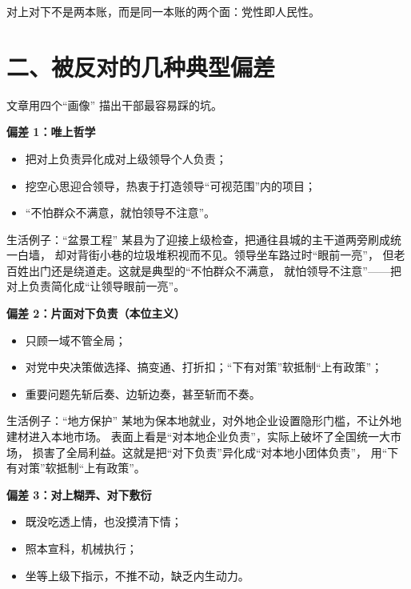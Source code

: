 \documentclass[11pt,a4paper]{ctexart}
\begin{document}
\begin{keypointblock}
对上对下不是两本账，而是同一本账的两个面：党性即人民性。
\end{keypointblock}

\section{二、被反对的几种典型偏差}

文章用四个``画像'' 描出干部最容易踩的坑。

\begin{caseblock}{}
\textbf{偏差 1：唯上哲学}
\begin{itemize}
  \item 把对上负责异化成对上级领导个人负责；
  \item 挖空心思迎合领导，热衷于打造领导``可视范围''内的项目；
  \item ``不怕群众不满意，就怕领导不注意''。
\end{itemize}
\end{caseblock}

\begin{exampleblock}{生活例子：``盆景工程''}
某县为了迎接上级检查，把通往县城的主干道两旁刷成统一白墙，
却对背街小巷的垃圾堆积视而不见。领导坐车路过时``眼前一亮''，
但老百姓出门还是绕道走。这就是典型的``不怕群众不满意，
就怕领导不注意''——把对上负责简化成``让领导眼前一亮''。
\end{exampleblock}

\begin{caseblock}{}
\textbf{偏差 2：片面对下负责（本位主义）}
\begin{itemize}
  \item 只顾一域不管全局；
  \item 对党中央决策做选择、搞变通、打折扣；``下有对策''软抵制``上有政策''；
  \item 重要问题先斩后奏、边斩边奏，甚至斩而不奏。
\end{itemize}
\end{caseblock}

\begin{exampleblock}{生活例子：``地方保护''}
某地为保本地就业，对外地企业设置隐形门槛，不让外地建材进入本地市场。
表面上看是``对本地企业负责''，实际上破坏了全国统一大市场，
损害了全局利益。这就是把``对下负责''异化成``对本地小团体负责''，
用``下有对策''软抵制``上有政策''。
\end{exampleblock}

\begin{caseblock}{}
\textbf{偏差 3：对上糊弄、对下敷衍}
\begin{itemize}
  \item 既没吃透上情，也没摸清下情；
  \item 照本宣科，机械执行；
  \item 坐等上级下指示，不推不动，缺乏内生动力。
\end{itemize}
\end{caseblock}
\end{document}
